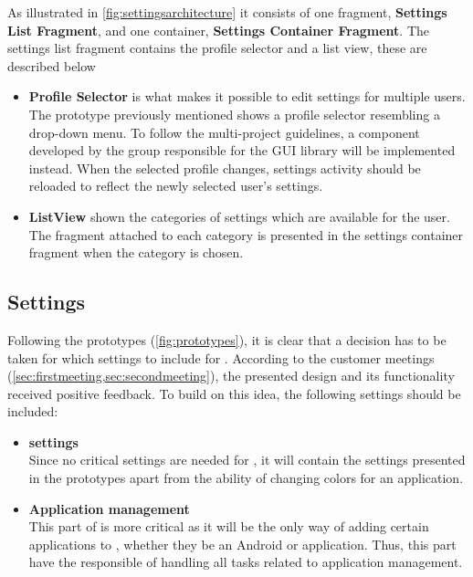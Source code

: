 As illustrated in \cref{fig:settingsarchitecture} it consists of one fragment, \textbf{Settings List Fragment}, and one container, \textbf{Settings Container Fragment}.
The settings list fragment contains the profile selector and a list view, these are described below
\begin{itemize}
\item \textbf{Profile Selector} is what makes it possible to edit settings for multiple users.
The prototype previously mentioned shows a profile selector resembling a drop-down menu.
To follow the multi-project guidelines, a component developed by the group responsible for the GUI library will be implemented instead.
When the selected profile changes, settings activity should be reloaded to reflect the newly selected user's settings.
\item \textbf{ListView} shown the categories of settings which are available for the user.
The fragment attached to each category is presented in the settings container fragment when the category is chosen.
\end{itemize}

\subsection{\launcher Settings}\label{sec:launchersettings}
Following the prototypes (\cref{fig:prototypes}), it is clear that a decision has to be taken for which settings to include for \launcher.
According to the customer meetings (\cref{sec:firstmeeting,sec:secondmeeting}), the presented design and its functionality received positive feedback.
To build on this idea, the following settings should be included:

\begin{itemize}
\item \textbf{\launcher settings}\\
Since no critical settings are needed for \launcher, it will contain the settings presented in the prototypes apart from the ability of changing colors for an application.
\item \textbf{Application management}\\
This part of \launcher is more critical as it will be the only way of adding certain applications to \launcher, whether they be an Android or \giraf application.
Thus, this part have the responsible of handling all tasks related to application management.
\end{itemize}

















